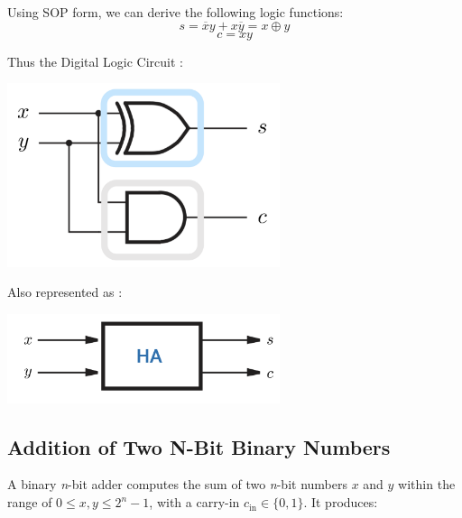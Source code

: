 \documentclass[12pt,openany]{book}
\newcommand*\xor{\oplus}
\begin{document}
			      	Using SOP form, we can derive the following logic functions:
			      	$$ s = \overline{x}y + x\overline{y} = x \xor y$$
			      	$$ c = xy$$
			      	
			      	Thus the Digital Logic Circuit : 
			      	\begin{center}
			      		\begin{minipage}[c]{0.60\textwidth} %
			      			\centering
			      			\includegraphics[width=0.60\textwidth]{circuits/7.1.3.png} %
			      		\end{minipage}
			      		
			      	\end{center}
			      	Also represented as :
			      	\begin{center}
			      		\begin{minipage}[c]{0.60\textwidth} %
			      			\centering
			      			\includegraphics[width=0.60\textwidth]{circuits/7.1.3_2.png} %
			      		\end{minipage}
			      		
			      	\end{center}
			      	\newpage
			      	
			      	\subsection{Addition of Two N-Bit Binary Numbers}
			      	A binary \textit{n}-bit adder computes the sum of two \textit{n}-bit numbers $x$ and $y$ within the range of $0 \leq x, y \leq 2^n - 1$, with a carry-in $c_{\text{in}} \in \{0, 1\}$. It produces:
			      	
\end{document}
